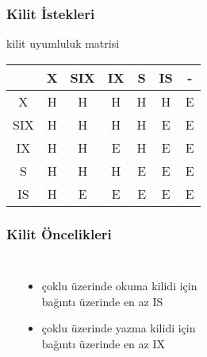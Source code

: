\documentclass[dvipsnames]{beamer}
\theoremstyle{definition}
\theoremstyle{example}
\theoremstyle{plain}
\begin{document}
\begin{frame}
  \frametitle{Kilit İstekleri}

  \begin{block}{kilit uyumluluk matrisi}
    \begin{table}
      \begin{tabular}{|c||c|c|c|c|c|c|}\hline
    & X & SIX & IX & S & IS & -\\\hline\hline
  X & H &  H  & H  & H & H  & E\\\hline
SIX & H &  H  & H  & H & E  & E\\\hline
 IX & H &  H  & E  & H & E  & E\\\hline
  S & H &  H  & H  & E & E  & E\\\hline
 IS & H &  E  & E  & E & E  & E\\\hline
      \end{tabular}
    \end{table}
  \end{block}
\end{frame}

\begin{frame}
  \frametitle{Kilit Öncelikleri}

  \begin{columns}[t]
    \begin{center}
    \end{center}

    \pause
    \begin{itemize}
      \item çoklu üzerinde okuma kilidi için\\
	bağıntı üzerinde en az IS
      \item çoklu üzerinde yazma kilidi için\\
	bağıntı üzerinde en az IX
    \end{itemize}
  \end{columns}
\end{frame}
\end{document}
